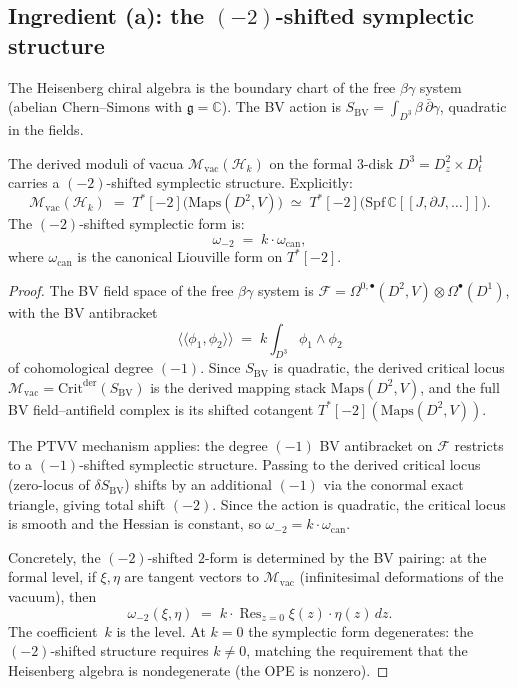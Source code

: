 \documentclass[11pt]{article}
\newcommand{\cM}{\mathcal{M}}
\newcommand{\cH}{\mathcal{H}}
\newcommand{\fg}{\mathfrak{g}}
\newcommand{\C}{\mathbb{C}}
\newcommand{\Res}{\operatorname{Res}}
\begin{document}
\subsection{Ingredient (a): the $(-2)$-shifted symplectic structure}

The Heisenberg chiral algebra is the boundary chart of the free
$\beta\gamma$ system (abelian Chern--Simons with $\fg = \C$).  The
BV action is $S_{\mathrm{BV}} = \int_{D^3} \beta\,\bar\partial\gamma$,
quadratic in the fields.

\begin{proposition}[Ingredient (a) for $\cH_k$]
\label{prop:steinberg-a-heisenberg}
The derived moduli of vacua $\cM_{\mathrm{vac}}(\cH_k)$ on the
formal $3$-disk $D^3 = D^2_z \times D^1_t$ carries a $(-2)$-shifted
symplectic structure.  Explicitly:
\[
\cM_{\mathrm{vac}}(\cH_k)
\;=\;
T^*[-2]\bigl(\mathrm{Maps}(D^2, V)\bigr)
\;\simeq\;
T^*[-2]\bigl(\mathrm{Spf}\,\C[[J, \partial J, \ldots]]\bigr).
\]
The $(-2)$-shifted symplectic form is:
\begin{equation}\label{eq:omega-minus-2-heisenberg}
\omega_{-2}
\;=\;
k \cdot \omega_{\mathrm{can}},
\end{equation}
where $\omega_{\mathrm{can}}$ is the canonical Liouville form on
$T^*[-2]$.
\end{proposition}

\begin{proof}
The BV field space of the free $\beta\gamma$ system is
$\mathcal{F} = \Omega^{0,\bullet}(D^2, V) \otimes \Omega^\bullet(D^1)$,
with the BV antibracket
\[
\langle\!\langle \phi_1, \phi_2 \rangle\!\rangle
\;=\;
k \int_{D^3} \phi_1 \wedge \phi_2
\]
of cohomological degree $(-1)$.  Since $S_{\mathrm{BV}}$ is
quadratic, the derived critical locus
$\cM_{\mathrm{vac}} = \mathrm{Crit}^{\mathrm{der}}(S_{\mathrm{BV}})$
is the derived mapping stack $\mathrm{Maps}(D^2, V)$, and the full
BV field--antifield complex is its shifted cotangent
$T^*[-2](\mathrm{Maps}(D^2, V))$.

The PTVV mechanism applies: the degree $(-1)$ BV antibracket on
$\mathcal{F}$ restricts to a $(-1)$-shifted symplectic structure.
Passing to the derived critical locus (zero-locus of
$\delta S_{\mathrm{BV}}$) shifts by an additional $(-1)$ via the
conormal exact triangle, giving total shift $(-2)$.  Since the
action is quadratic, the critical locus is smooth and the Hessian
is constant, so $\omega_{-2} = k \cdot \omega_{\mathrm{can}}$.

Concretely, the $(-2)$-shifted $2$-form is determined by the BV
pairing: at the formal level, if $\xi, \eta$ are tangent vectors to
$\cM_{\mathrm{vac}}$ (infinitesimal deformations of the vacuum),
then
\[
\omega_{-2}(\xi, \eta)
\;=\;
k \cdot \Res_{z=0} \xi(z) \cdot \eta(z) \, dz.
\]
The coefficient~$k$ is the level.  At $k = 0$ the symplectic
form degenerates: the $(-2)$-shifted structure requires
$k \ne 0$, matching the requirement that the Heisenberg algebra
is nondegenerate (the OPE is nonzero).
\end{proof}
\end{document}
